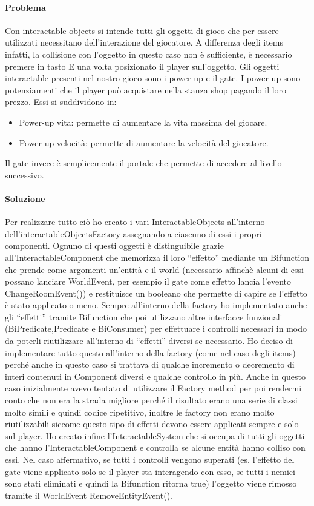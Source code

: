 \documentclass[a4paper,12pt]{report}
\begin{document}
\paragraph*{Problema}
	Con interactable objects si intende tutti gli oggetti di gioco che per essere utilizzati necessitano dell'interazione del giocatore. A differenza degli items infatti, la collisione con l'oggetto in questo caso non è sufficiente, è necessario premere in tasto E una volta posizionato il player sull'oggetto.
	Gli oggetti interactable presenti nel nostro gioco sono i power-up e il gate. 
	I power-up sono potenziamenti che il player può acquistare nella stanza shop pagando il loro prezzo. Essi si suddividono in:
	\begin{itemize} 
		\item Power-up vita: permette di aumentare la vita massima del giocare.
		\item Power-up velocità: permette di aumentare la velocità del giocatore.
	\end{itemize}
	Il gate invece è semplicemente il portale che permette di accedere al livello successivo. 

\paragraph*{Soluzione}
	Per realizzare tutto ciò ho creato i vari InteractableObjects all'interno dell'interactableObjectsFactory assegnando a ciascuno di essi i propri componenti. Ognuno di questi oggetti è distinguibile grazie all'InteractableComponent che memorizza il loro “effetto” mediante un Bifunction che prende come argomenti un'entità e il world (necessario affinchè alcuni di essi possano lanciare WorldEvent, per esempio il gate come effetto lancia l'evento ChangeRoomEvent()) e restituisce un booleano che permette di capire se l'effetto è stato applicato o meno.
	Sempre all'interno della factory ho implementato anche gli “effetti” tramite Bifunction che poi utilizzano altre interfacce funzionali (BiPredicate,Predicate e BiConsumer) per effettuare i controlli necessari in modo da poterli riutilizzare all'interno di “effetti” diversi se necessario. Ho deciso di implementare tutto questo all'interno della factory (come nel caso degli items) perché anche in questo caso si trattava di qualche incremento o decremento di interi contenuti in Component diversi e qualche controllo in più. Anche in questo caso inizialmente avevo tentato di utilizzare il Factory method per poi rendermi conto che non era la strada migliore perché il risultato erano una serie di classi molto simili e quindi codice ripetitivo, inoltre le factory non erano molto riutilizzabili siccome questo tipo di effetti devono essere applicati sempre e solo sul player.
	Ho creato infine l'InteractableSystem che si occupa di tutti gli oggetti che hanno l'InteractableComponent e controlla se alcune entità hanno colliso con essi. Nel caso affermativo, se tutti i controlli vengono superati (es. l'effetto del gate viene applicato solo se il player sta interagendo con esso, se tutti i nemici sono stati eliminati e quindi la Bifunction ritorna true) l'oggetto viene rimosso tramite il WorldEvent RemoveEntityEvent(). 
	
\end{document}

